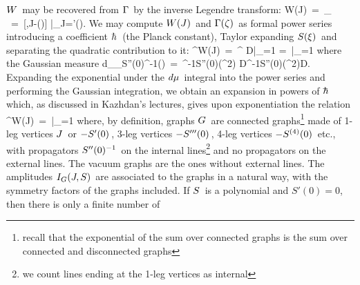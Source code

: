 \non
\qqq
$W\hspace{0.05cm}$ may be recovered from \s$\Gamma\hspace{0.05cm}$ by the
inverse Legendre transform:
\qq
W(J)\ =\ {\limits_{\zeta\in \NE}}\s
{}
\ =\ [\s\langle\m\zeta\m,\m J\m\rangle\s-\s \Gamma(\zeta)\s]
\bigg|_{{J=\Gamma'(\zeta)}}\s.
\label{ilt}
\qqq
We may compute \s$W(J)\hspace{0.05cm}$ and \s$\Gamma(\zeta)\hspace{0.05cm}$ as formal
power series introducing a coefficient \s$\hh\s$
(the Planck constant), Taylor expanding \s$S(\xi)\hspace{0.05cm}$
and separating the quadratic contribution to it:
\qq
\ee^{\m W(J)}\ =\ \int\ee^{
}\s\s D\xi\s\bigg|_{{\hh}=1}\hspace{8.5cm}\cr\cr\cr
=\ \bigg|_{{\hh}=1}
\label{form0}
\qqq
where the Gaussian measure
\qq
d\mu_{_{\hh\m S''(0)^{-1}}}(\xi)\
=\ {\ee^{-{1\hh}\m S''(0)(\xi^2)}
\s\s D\xi\over\int\ee^{-{1\over 2\hh}\s S''(0)(\xi^2)}\s\s D\xi}\s.
\qqq
Expanding the exponential under the \s$d\mu\hspace{0.05cm}$ integral
into the power series and performing the Gaussian integration,
we obtain an expansion in powers of \s$\hh\s$ which,
as discussed in Kazhdan's lectures, gives upon
exponentiation the relation
\qq
\ee^{\m W(J)}\ =\
\bigg|_{{\hh}=1}\hspace{1.2cm}
\label{form}
\qqq
where, by definition, graphs \s$G\hspace{0.05cm}$ are
connected graphs\footnote{recall that the exponential
of the sum over connected graphs is the sum over connected
and disconnected graphs}
made of 1-leg vertices \s$J\hspace{0.05cm}$ or \s$-S'(0)\hspace{0.05cm}$,
3-leg vertices \s$-S'''(0)\hspace{0.05cm}$, 4-leg vertices
\s$-S^{(4)}(0)\hspace{0.05cm}$ etc., with propagators \s$S''(0)^{-1}\hspace{0.05cm}$
on the internal lines\footnote{we count lines ending at the
1-leg vertices as internal} and no propagators on the external lines.
The vacuum graphs are the ones without external lines.
The amplitudes
\s$I_G(J,S)\hspace{0.05cm}$ are associated to the graphs in a natural way,
with the symmetry factors of the graphs included. If \s$S\hspace{0.05cm}$
is a polynomial and $S'(0)=0$, then there is only a finite number of
